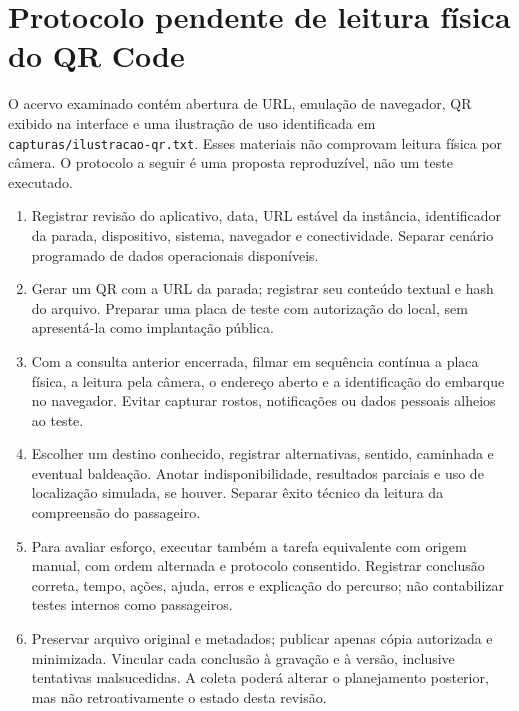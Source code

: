 \chapter{Protocolo pendente de leitura física do QR Code}\label{ap:protocolo-qr}
O acervo examinado contém abertura de URL, emulação de navegador, QR exibido na interface e uma ilustração de uso identificada em \nolinkurl{capturas/ilustracao-qr.txt}. Esses materiais não comprovam leitura física por câmera. O protocolo a seguir é uma proposta reproduzível, não um teste executado.
\begin{enumerate}[leftmargin=*,itemsep=4pt]
\item Registrar revisão do aplicativo, data, URL estável da instância, identificador da parada, dispositivo, sistema, navegador e conectividade. Separar cenário programado de dados operacionais disponíveis.
\item Gerar um QR com a URL da parada; registrar seu conteúdo textual e hash do arquivo. Preparar uma placa de teste com autorização do local, sem apresentá-la como implantação pública.
\item Com a consulta anterior encerrada, filmar em sequência contínua a placa física, a leitura pela câmera, o endereço aberto e a identificação do embarque no navegador. Evitar capturar rostos, notificações ou dados pessoais alheios ao teste.
\item Escolher um destino conhecido, registrar alternativas, sentido, caminhada e eventual baldeação. Anotar indisponibilidade, resultados parciais e uso de localização simulada, se houver. Separar êxito técnico da leitura da compreensão do passageiro.
\item Para avaliar esforço, executar também a tarefa equivalente com origem manual, com ordem alternada e protocolo consentido. Registrar conclusão correta, tempo, ações, ajuda, erros e explicação do percurso; não contabilizar testes internos como passageiros.
\item Preservar arquivo original e metadados; publicar apenas cópia autorizada e minimizada. Vincular cada conclusão à gravação e à versão, inclusive tentativas malsucedidas. A coleta poderá alterar o planejamento posterior, mas não retroativamente o estado desta revisão.
\end{enumerate}
